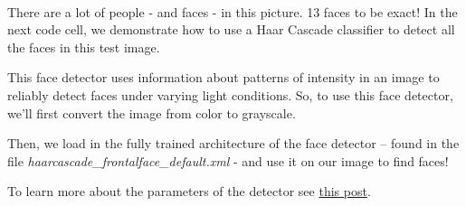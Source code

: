 \documentclass[11pt]{article}
\begin{document}
    \begin{center}
    \end{center}
    { \hspace*{\fill} \\}
    
    There are a lot of people - and faces - in this picture. 13 faces to be
exact! In the next code cell, we demonstrate how to use a Haar Cascade
classifier to detect all the faces in this test image.

This face detector uses information about patterns of intensity in an
image to reliably detect faces under varying light conditions. So, to
use this face detector, we'll first convert the image from color to
grayscale.

Then, we load in the fully trained architecture of the face detector --
found in the file \emph{haarcascade\_frontalface\_default.xml} - and use
it on our image to find faces!

To learn more about the parameters of the detector see
\href{https://stackoverflow.com/questions/20801015/recommended-values-for-opencv-detectmultiscale-parameters}{this
post}.
\end{document}
